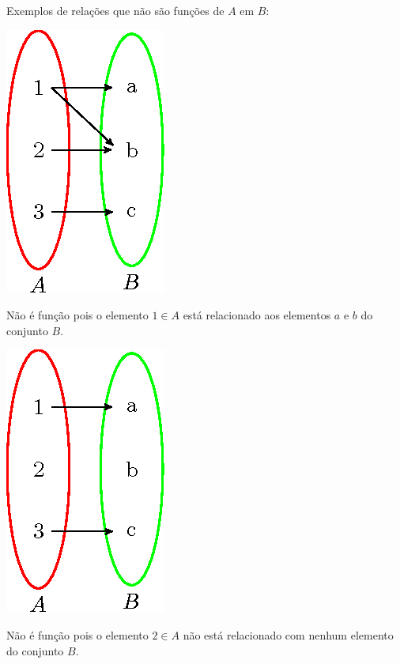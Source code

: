  Exemplos de relações que não são funções de $A$ em $B$:
\begin{multicols}{2}
\includegraphics{cap_funcao/figs/tikz/figura_cap_funcao_4}

Não é função pois o elemento $1 \in A$ está relacionado aos elementos $a$ e $b$ do conjunto $B$.
\end{multicols}

\begin{multicols}{2}
\includegraphics{cap_funcao/figs/tikz/figura_cap_funcao_5}

Não é função pois o elemento $2 \in A$ não está relacionado com nenhum elemento do conjunto $B$.
\end{multicols}

